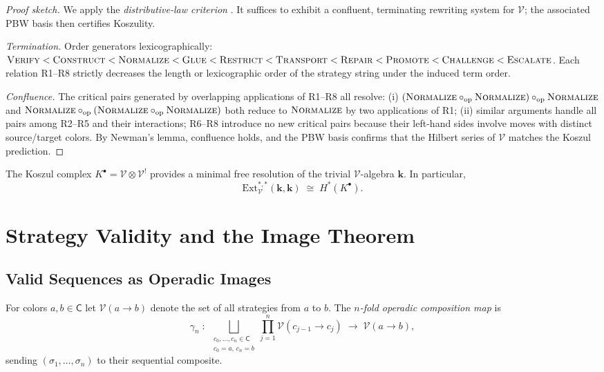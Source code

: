 \documentclass[11pt]{article}
\newcommand{\Vop}{\mathcal{V}}           %
\newcommand{\Kd}{\mathcal{V}^{!}}        %
\newcommand{\GrColor}{\mathsf{C}}        %
\newcommand{\Kcom}{K^{\bullet}}          %
\newcommand{\opcomp}{\circ_{\mathrm{op}}}%
\newcommand{\strat}{\sigma}              %
\begin{document}
\begin{proof}[Proof sketch]
We apply the \emph{distributive-law criterion}
\cite[Thm.~4.2.5]{Loday2012AlgebrasOperads}.
It suffices to exhibit a confluent, terminating rewriting system for
$\Vop$; the associated PBW basis then certifies Koszulity.

\emph{Termination.}
Order generators lexicographically:
$\textsc{Verify} < \textsc{Construct} < \textsc{Normalize} < \textsc{Glue} < \textsc{Restrict}
 < \textsc{Transport} < \textsc{Repair} < \textsc{Promote} < \textsc{Challenge} < \textsc{Escalate}$.
Each relation R1--R8 strictly decreases the length or lexicographic
order of the strategy string under the induced term order.

\emph{Confluence.}
The critical pairs generated by overlapping applications of R1--R8
all resolve:
(i) $(\NORMALIZE \opcomp \NORMALIZE) \opcomp \NORMALIZE$ and
    $\NORMALIZE \opcomp (\NORMALIZE \opcomp \NORMALIZE)$ both
    reduce to $\textsc{Normalize}$ by two applications of R1;
(ii) similar arguments handle all pairs among R2--R5 and their
interactions; R6--R8 introduce no new critical pairs because their
left-hand sides involve moves with distinct source/target colors.
By Newman's lemma, confluence holds, and the PBW basis confirms
that the Hilbert series of $\Vop$ matches the Koszul prediction.
\end{proof}

\begin{corollary}\label{cor:koszulres}
The Koszul complex $\Kcom = \Vop \otimes \Kd$ provides a minimal free
resolution of the trivial $\Vop$-algebra $\mathbf{k}$.  In particular,
\[
  \mathrm{Ext}_{\Vop}^{*,*}(\mathbf{k},\mathbf{k}) \;\cong\; H^*(\Kcom).
\]
\end{corollary}

\section{Strategy Validity and the Image Theorem}\label{sec:validity}

\subsection{Valid Sequences as Operadic Images}

\begin{definition}\label{def:opcomp}
For colors $a, b \in \GrColor$ let $\Vop(a \to b)$ denote the set of
all strategies from $a$ to $b$.  The \emph{$n$-fold operadic composition
map} is
\[
  \gamma_n \;:\;
  \bigsqcup_{\substack{c_0,\ldots,c_n \in \GrColor \\ c_0 = a,\, c_n = b}}
  \prod_{j=1}^{n} \Vop(c_{j-1} \to c_j)
  \;\longrightarrow\; \Vop(a \to b),
\]
sending $(\strat_1,\ldots,\strat_n)$ to their sequential composite.
\end{definition}
\end{document}
